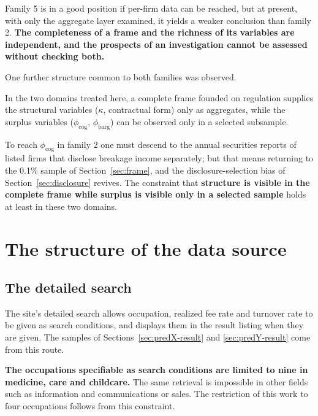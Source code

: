 Family 5 is in a good position if per-firm data can be reached, but at present, with only the
aggregate layer examined, it yields a weaker conclusion than family 2. \textbf{The completeness of
a frame and the richness of its variables are independent, and the prospects of an investigation
cannot be assessed without checking both.}

One further structure common to both families was observed.

\begin{proposition}
In the two domains treated here, a complete frame founded on regulation supplies the structural
variables ($\kappa$, contractual form) only as aggregates, while the surplus variables
($\phi_{\mathrm{cog}}$, $\phi_{\mathrm{barg}}$) can be observed only in a selected subsample.
\end{proposition}

To reach $\phi_{\mathrm{cog}}$ in family 2 one must descend to the annual securities reports of
listed firms that disclose breakage income separately; but that means returning to the 0.1\%
sample of Section~\ref{sec:frame}, and the disclosure-selection bias of
Section~\ref{sec:disclosure} revives. The constraint that \textbf{structure is visible in the
complete frame while surplus is visible only in a selected sample} holds at least in these two
domains.

\section{The structure of the data source}
\label{sec:pilot}

\subsection{The detailed search}
\label{sec:search-route}

The site's detailed search allows occupation, realized fee rate and turnover rate to be given as
search conditions, and displays them in the result listing when they are given. The samples of
Sections~\ref{sec:predX-result} and \ref{sec:predY-result} come from this route.

\textbf{The occupations specifiable as search conditions are limited to nine in medicine, care and
childcare.} The same retrieval is impossible in other fields such as information and
communications or sales. The restriction of this work to four occupations follows from this
constraint.

